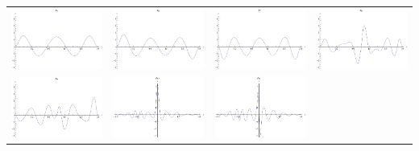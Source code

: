 \documentclass{article}
\begin{document}
\begin{landscape}
\begin{tabular}{cccc}
\includegraphics[width=5.0cm]{decic_bspline_5.pdf}& \includegraphics[width=5.0cm]{decic_bspline_6.pdf}& \includegraphics[width=5.0cm]{decic_bspline_7.pdf}& \includegraphics[width=5.0cm]{decic_bspline_8.pdf} \\
\includegraphics[width=5.0cm]{decic_bspline_9.pdf}& \includegraphics[width=5.0cm]{decic_bspline_10.pdf}& \includegraphics[width=5.0cm]{decic_bspline_11.pdf}\end{tabular} 
 \end{landscape}
\end{document}

